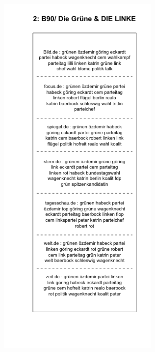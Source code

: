 \documentclass[12pt,a4paper,notitlepage]{article}
\begin{document}
\begin{figure}[H]
\begin{center}
\begin{subfigure}[normla]{0.49\textwidth}
		\end{subfigure}
		\begin{subfigure}[normla]{0.49\textwidth}
			\includegraphics[width=\textwidth]{../figs/plotquote2.png}
		\end{subfigure}
	\end{center}
\end{figure}
	
\end{document}
